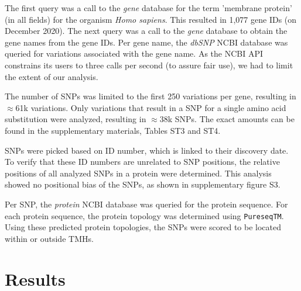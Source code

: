 \documentclass[utf8]{frontiersSCNS} %
\begin{document}

The first query was a call to the \emph{gene} database for the 
term 'membrane protein' (in all fields) 
for the organism \emph{Homo sapiens}.
This resulted in 1,077 gene IDs (on December 2020).
The next query was a call to the \emph{gene} database 
to obtain the gene names from the gene IDs.
Per gene name, the \emph{dbSNP} NCBI database was queried for 
variations associated with the gene name. 
As the NCBI API constrains its users to three calls per second
(to assure fair use), we had to limit the extent of our analysis.

The number of SNPs was limited to the first 250 variations per gene,
resulting in $\approx$61k variations.
Only variations that result in a SNP for
a single amino acid substitution were analyzed, resulting in $\approx$38k SNPs.
The exact amounts can be found in the supplementary materials,
Tables ST3 and ST4.

%
SNPs were picked based on ID number, which is linked to their discovery date. To verify that these ID numbers are unrelated to SNP positions, the relative positions of all analyzed SNPs in a protein were determined. This analysis showed no positional bias of the SNPs, as shown in supplementary figure S3.

Per SNP, the \emph{protein} NCBI database was queried for the
protein sequence. For each protein sequence, the protein topology was determined using \verb;PureseqTM;. Using these predicted protein topologies, the SNPs were scored to be located within or outside TMHs.


\section{Results}

\end{document}
